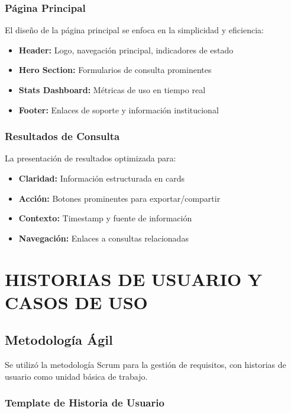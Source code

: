 \documentclass[12pt,a4paper]{article}
\begin{document}
\subsubsection{Página Principal}

El diseño de la página principal se enfoca en la simplicidad y eficiencia:

\begin{itemize}
    \item \textbf{Header:} Logo, navegación principal, indicadores de estado
    \item \textbf{Hero Section:} Formularios de consulta prominentes
    \item \textbf{Stats Dashboard:} Métricas de uso en tiempo real
    \item \textbf{Footer:} Enlaces de soporte y información institucional
\end{itemize}

\subsubsection{Resultados de Consulta}

La presentación de resultados optimizada para:

\begin{itemize}
    \item \textbf{Claridad:} Información estructurada en cards
    \item \textbf{Acción:} Botones prominentes para exportar/compartir
    \item \textbf{Contexto:} Timestamp y fuente de información
    \item \textbf{Navegación:} Enlaces a consultas relacionadas
\end{itemize}

\section{HISTORIAS DE USUARIO Y CASOS DE USO}

\subsection{Metodología Ágil}

Se utilizó la metodología Scrum para la gestión de requisitos, con historias de usuario como unidad básica de trabajo.

\subsubsection{Template de Historia de Usuario}
\end{document}

